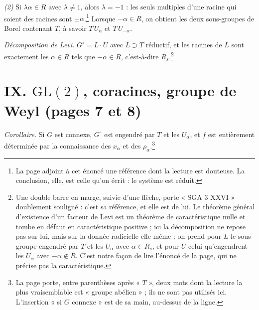 \documentclass[11pt,a4paper]{article}
\begin{document}
\emph{(2)} Si $\lambda\alpha \in R$ avec $\lambda \neq 1$, alors $\lambda =
-1$ : les seuls multiples d'une racine qui soient des racines sont
$\pm\alpha$.\footnote{La page adjoint à cet énoncé une référence dont la
lecture est douteuse. La conclusion, elle, est celle qu'on écrit : le système
est réduit.} Lorsque $-\alpha \in R$, on obtient les deux sous-groupes de Borel
contenant $T$, à savoir $T\,U_\alpha$ et $T\,U_{-\alpha}$.

\emph{Décomposition de Levi.} $G^\circ = L \cdot U$ avec $L \supset T$
réductif, et les racines de $L$ sont exactement les $\alpha \in R$ tels que
$-\alpha \in R$, c'est-à-dire $R_s$.\footnote{Une double barre en marge, suivie
d'une flèche, porte « SGA 3 XXVI » doublement souligné : c'est sa référence, et
elle est de lui. Le théorème général d'existence d'un facteur de Levi est un
théorème de caractéristique nulle et tombe en défaut en caractéristique
positive ; ici la décomposition ne repose pas sur lui, mais sur la donnée
radicielle elle-même : on prend pour $L$ le sous-groupe engendré par $T$ et les
$U_\alpha$ avec $\alpha \in R_s$, et pour $U$ celui qu'engendrent les
$U_\alpha$ avec $-\alpha \notin R$. C'est notre façon de lire l'énoncé de la
page, qui ne précise pas la caractéristique.}

\section*{IX. $\mathrm{GL}(2)$, coracines, groupe de Weyl (pages 7 et 8)}

\emph{Corollaire.} Si $G$ est connexe, $G^\circ$ est engendré par $T$ et les
$U_\alpha$, et $f$ est entièrement déterminée par la connaissance des
$x_\alpha$ et des $\rho_\alpha$.\footnote{La page porte, entre parenthèses
après « $T$ », deux mots dont la lecture la plus vraisemblable est « groupe
abélien » ; ils ne sont pas utilisés ici. L'insertion « si $G$ connexe » est
de sa main, au-dessus de la ligne.}
\end{document}

